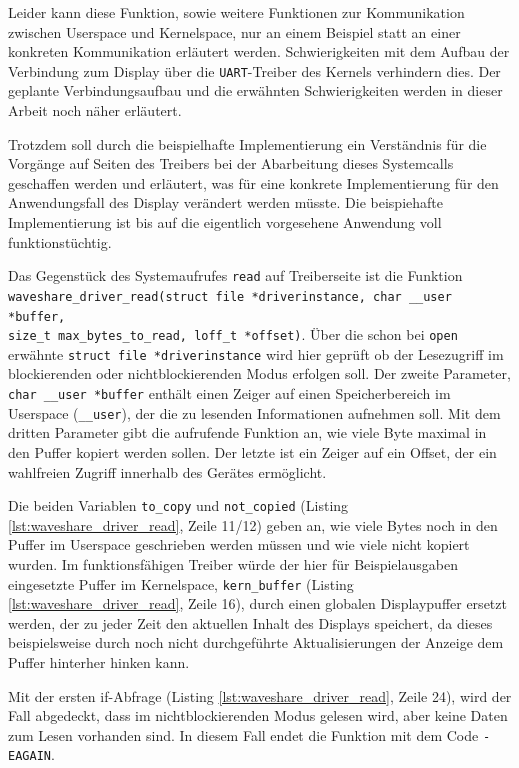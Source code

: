 Leider kann diese Funktion, sowie weitere Funktionen zur Kommunikation zwischen Userspace und Kernelspace, nur an einem Beispiel statt an einer konkreten Kommunikation erläutert werden. Schwierigkeiten mit dem Aufbau der Verbindung zum Display über die \texttt{UART}-Treiber des Kernels verhindern dies. Der geplante Verbindungsaufbau und die erwähnten Schwierigkeiten werden in dieser Arbeit noch näher erläutert. 

Trotzdem soll durch die beispielhafte Implementierung ein Verständnis für die Vorgänge auf Seiten des Treibers bei der Abarbeitung dieses Systemcalls geschaffen werden und erläutert, was für eine konkrete Implementierung für den Anwendungsfall des Display verändert werden müsste. Die beispiehafte Implementierung ist bis auf die eigentlich vorgesehene Anwendung voll funktionstüchtig.\newline


Das Gegenstück des Systemaufrufes \texttt{read} auf Treiberseite ist die Funktion \\
\texttt{waveshare_driver_read(struct file *driverinstance, char __user *buffer,} \\
\texttt{size_t max_bytes_to_read, loff_t *offset)}. Über die schon bei \texttt{open} erwähnte \texttt{struct file *driverinstance} wird hier geprüft ob der Lesezugriff im blockierenden oder nichtblockierenden Modus erfolgen soll. Der zweite Parameter, \texttt{char __user *buffer} enthält einen Zeiger auf einen Speicherbereich im Userspace (\texttt{{\_}{\_user}}), der die zu lesenden Informationen aufnehmen soll. Mit dem dritten Parameter gibt die aufrufende Funktion an, wie viele Byte maximal in den Puffer kopiert werden sollen. Der letzte ist ein Zeiger auf ein Offset, der ein wahlfreien Zugriff innerhalb des Gerätes ermöglicht. 

Die beiden Variablen \texttt{to\_copy} und \texttt{not\_copied} (Listing \ref{lst:waveshare_driver_read}, Zeile 11/12) geben an, wie viele Bytes noch in den Puffer im Userspace geschrieben werden müssen und wie viele nicht kopiert wurden. Im funktionsfähigen Treiber würde der hier für Beispielausgaben eingesetzte Puffer im Kernelspace, \texttt{kern\_buffer} (Listing \ref{lst:waveshare_driver_read}, Zeile 16), durch einen globalen Displaypuffer ersetzt werden, der zu jeder Zeit den aktuellen Inhalt des Displays speichert, da dieses beispielsweise durch noch nicht durchgeführte Aktualisierungen der Anzeige dem Puffer hinterher hinken kann. 

Mit der ersten if-Abfrage (Listing \ref{lst:waveshare_driver_read}, Zeile 24), wird der Fall abgedeckt, dass im nichtblockierenden Modus gelesen wird, aber keine Daten zum Lesen vorhanden sind. In diesem Fall endet die Funktion mit dem Code \texttt{-EAGAIN}. 

